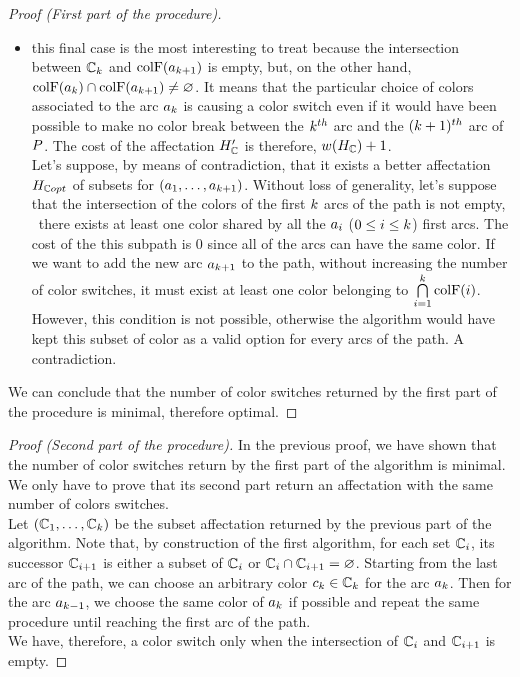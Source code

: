 \begin{proof}[Proof (First part of the procedure)]
\begin{itemize}
\begin{itemize}
            \item this final case is the most interesting to treat because the intersection between $\mathbb{C}_{k}$ and $\text{colF}(a_{k+1})$ is empty, but, on the other hand, $\text{colF}(a_{k}) \cap \text{colF}(a_{k+1}) \neq \varnothing$. It means that the particular choice of colors associated to the arc $a_k$ is causing a color switch even if it would have been possible to make no color break between the $k^{th}$ arc and the  $(k+1)^{th}$ arc of $P$. The cost of the affectation $H_{\mathbb{C}}'$ is therefore, $w(H_{\mathbb{C}}) + 1$.\\
                  Let's suppose, by means of contradiction, that it exists a better affectation $H_{\mathbb{C} opt}$ of subsets for $(a_1,\ldots,a_{k + 1})$. Without loss of generality, let's suppose that the intersection of the colors of the first $k$ arcs of the path is not empty, \ie\ there exists at least one color shared by all the $a_i$ ($0 \leq i \leq k$) first arcs. The cost of the this subpath is $0$ since all of the arcs can have the same color. If we want to add the new arc $a_{k + 1}$ to the path, without increasing the number of color switches, it must exist at least one color belonging to $\bigcap\limits_{i = 1}^k \text{colF}(i)$. However, this condition is not possible, otherwise the algorithm would have kept this subset of color as a valid option for every arcs of the path. A contradiction.
          \end{itemize}
  \end{itemize}
  We can conclude that the number of color switches returned by the first part of the procedure is minimal, therefore optimal.
\end{proof}

\begin{proof}[Proof (Second part of the procedure)]
  In the previous proof, we have shown that the number of color switches return by the first part of the algorithm is minimal. We only have to prove that its second part return an affectation with the same number of colors switches.\\
  Let $(\mathbb{C}_1,\ldots,\mathbb{C}_{k})$ be the subset affectation returned by the previous part of the algorithm. Note that, by construction of the first algorithm, for each set $\mathbb{C}_i$, its successor $\mathbb{C}_{i+1}$ is either a subset of $\mathbb{C}_i$ or $\mathbb{C}_i \cap \mathbb{C}_{i+1} = \varnothing$.
  Starting from the last arc of the path, we can choose an arbitrary color $c_k \in \mathbb{C}_k$ for the arc $a_k$. Then for the arc $a_{k-1}$, we choose the same color of $a_k$ if possible and repeat the same procedure until reaching the first arc of the path.\\
  We have, therefore, a color switch only when the intersection of $\mathbb{C}_i$ and $\mathbb{C}_{i+1}$ is empty.
\end{proof}

